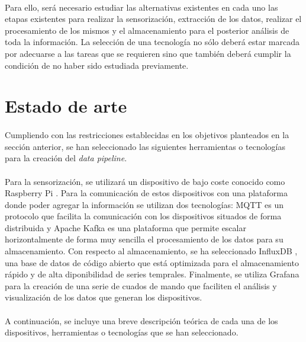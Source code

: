 \documentclass[12pt, a4paper]{article}
\begin{document}
        \paragraph{}
        Para ello, será necesario estudiar las alternativas existentes en cada uno las etapas existentes para realizar la sensorización, extracción de los datos, realizar el procesamiento de los mismos y el almacenamiento para el posterior análisis de toda la información. La selección de una tecnología no sólo deberá estar marcada por adecuarse a las tareas que se requieren sino que también deberá cumplir la condición de no haber sido estudiada previamente.

        \section{Estado de arte}

        \paragraph{}
        Cumpliendo con las restricciones establecidas en los objetivos planteados en la sección anterior, se han seleccionado las siguientes herramientas o tecnologías para la creación del \textit{data pipeline}. 
        
        \paragraph{}
        Para la sensorización, se utilizará un dispositivo de bajo coste conocido como Raspberry Pi \cite{raspberry}. Para la comunicación de estos dispositivos con una plataforma donde poder agregar la información se utilizan dos tecnologías: MQTT \cite{mqtt} es un protocolo que facilita la comunicación con los dispositivos situados de forma distribuida y Apache Kafka \cite{kafka} es una plataforma que permite escalar horizontalmente de forma muy sencilla el procesamiento de los datos para su almacenamiento. Con respecto al almacenamiento, se ha seleccionado InfluxDB \cite{influx}, una base de datos de código abierto que está optimizada para el almacenamiento rápido y de alta diponibilidad de series temprales. Finalmente, se utiliza Grafana \cite{grafana} para la creación de una serie de cuados de mando que faciliten el análisis y visualización de los datos que generan los dispositivos.

        \paragraph{}
        A continuación, se incluye una breve descripción teórica de cada una de los dispositivos, herramientas o tecnologías que se han seleccionado.
\end{document}
